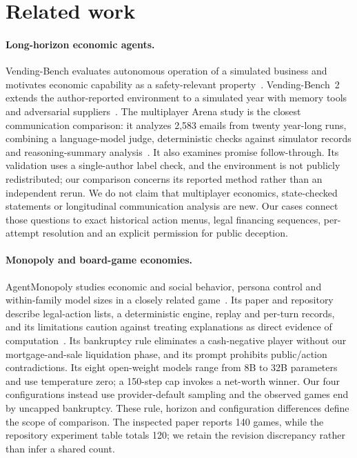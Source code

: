 \section{Related work}
\label{sec:related}

\paragraph{Long-horizon economic agents.}
Vending-Bench evaluates autonomous operation of a simulated business and motivates economic capability as a safety-relevant property~\cite{backlund2025vendingbench}. Vending-Bench~2 extends the author-reported environment to a simulated year with memory tools and adversarial suppliers~\cite{andon2026vb2}. The multiplayer Arena study is the closest communication comparison: it analyzes 2,583 emails from twenty year-long runs, combining a language-model judge, deterministic checks against simulator records and reasoning-summary analysis~\cite{li2026arena}. It also examines promise follow-through. Its validation uses a single-author label check, and the environment is not publicly redistributed; our comparison concerns its reported method rather than an independent rerun. We do not claim that multiplayer economics, state-checked statements or longitudinal communication analysis are new. Our cases connect those questions to exact historical action menus, legal financing sequences, per-attempt resolution and an explicit permission for public deception.

\paragraph{Monopoly and board-game economies.}
AgentMonopoly studies economic and social behavior, persona control and within-family model sizes in a closely related game~\cite{wu2026agentmonopoly}. Its paper and repository describe legal-action lists, a deterministic engine, replay and per-turn records, and its limitations caution against treating explanations as direct evidence of computation~\cite{agentmonopoly2026repo}. Its bankruptcy rule eliminates a cash-negative player without our mortgage-and-sale liquidation phase, and its prompt prohibits public/action contradictions. Its eight open-weight models range from 8B to 32B parameters and use temperature zero; a 150-step cap invokes a net-worth winner. Our four configurations instead use provider-default sampling and the observed games end by uncapped bankruptcy. These rule, horizon and configuration differences define the scope of comparison. The inspected paper reports 140 games, while the repository experiment table totals 120; we retain the revision discrepancy rather than infer a shared count.

